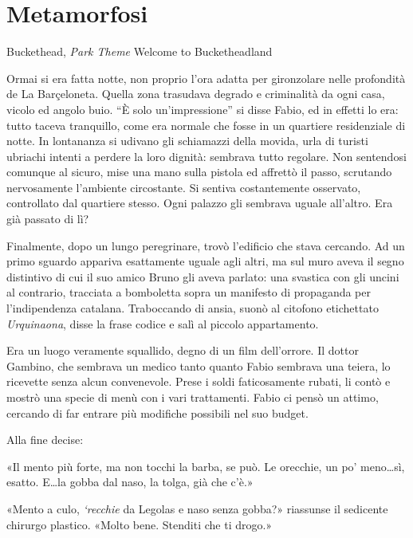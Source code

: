 \chapter{Metamorfosi}

\begin{chapquote}{Buckethead, \textit{Park Theme}}
	Welcome to Bucketheadland
\end{chapquote}


Ormai si era fatta notte, non proprio l'ora adatta per gironzolare nelle profondità de La Barçeloneta. Quella zona trasudava degrado e criminalità da ogni casa, vicolo ed angolo buio. ``È solo un'impressione'' si disse Fabio, ed in effetti lo era: tutto taceva tranquillo, come era normale che fosse in un quartiere residenziale di notte. In lontananza si udivano gli schiamazzi della movida, urla di turisti ubriachi intenti a perdere la loro dignità: sembrava tutto regolare. Non sentendosi comunque al sicuro, mise una mano sulla pistola ed affrettò il passo, scrutando nervosamente l'ambiente circostante. Si sentiva costantemente osservato, controllato dal quartiere stesso. Ogni palazzo gli sembrava uguale all'altro. Era già passato di lì?

Finalmente, dopo un lungo peregrinare, trovò l'edificio che stava cercando. Ad un primo sguardo appariva esattamente uguale agli altri, ma sul muro aveva il segno distintivo di cui il suo amico Bruno gli aveva parlato: una svastica con gli uncini al contrario, tracciata a bomboletta sopra un manifesto di propaganda per l'indipendenza catalana. Traboccando di ansia, suonò al citofono etichettato \textit{Urquinaona}, disse la frase codice e salì al piccolo appartamento.

Era un luogo veramente squallido, degno di un film dell'orrore. Il dottor Gambino, che sembrava un medico tanto quanto Fabio sembrava una teiera, lo ricevette senza alcun convenevole. Prese i soldi faticosamente rubati, li contò e mostrò una specie di menù con i vari trattamenti. Fabio ci pensò un attimo, cercando di far entrare più modifiche possibili nel suo budget.

Alla fine decise:

«Il mento più forte, ma non tocchi la barba, se può. Le orecchie, un po' meno\ldots sì, esatto. E\ldots la gobba dal naso, la tolga, già che c'è.»

«Mento a culo, \textit{`recchie} da Legolas e naso senza gobba?» riassunse il sedicente chirurgo plastico. «Molto bene. Stenditi che ti drogo.»

